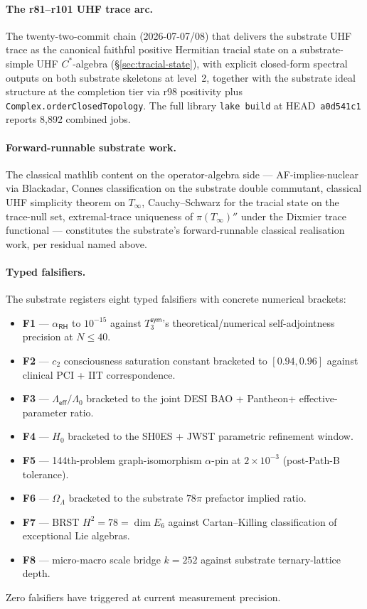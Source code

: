 \documentclass[11pt,a4paper]{amsart}
\theoremstyle{plain}
\theoremstyle{definition}
\begin{document}
\paragraph{The r81--r101 UHF trace arc.} The twenty-two-commit chain (2026-07-07/08) that delivers the substrate UHF trace as the canonical faithful positive Hermitian tracial state on a substrate-simple UHF $C^*$-algebra (\S\ref{sec:tracial-state}), with explicit closed-form spectral outputs on both substrate skeletons at level~2, together with the substrate ideal structure at the completion tier via r98 positivity plus \texttt{Complex.orderClosedTopology}. The full library \texttt{lake build} at HEAD~\texttt{a0d541c1} reports 8{,}892 combined jobs.

\paragraph{Forward-runnable substrate work.} The classical mathlib content on the operator-algebra side --- AF-implies-nuclear via Blackadar, Connes classification on the substrate double commutant, classical UHF simplicity theorem on $T_\infty$, Cauchy--Schwarz for the tracial state on the trace-null set, extremal-trace uniqueness of $\pi(T_\infty)''$ under the Dixmier trace functional --- constitutes the substrate's forward-runnable classical realisation work, per residual named above.

\paragraph{Typed falsifiers.} The substrate registers eight typed falsifiers with concrete numerical brackets:
\begin{itemize}[itemsep=1pt,leftmargin=2em]
\item \textbf{F1} — $\alpha_{\textsf{RH}}$ to $10^{-15}$ against $T_3^{\textsf{sym}}$'s theoretical/numerical self-adjointness precision at $N \le 40$.
\item \textbf{F2} — $c_2$ consciousness saturation constant bracketed to $[0.94, 0.96]$ against clinical PCI + IIT correspondence.
\item \textbf{F3} — $\Lambda_{\textsf{eff}}/\Lambda_0$ bracketed to the joint DESI BAO + Pantheon+ effective-parameter ratio.
\item \textbf{F4} — $H_0$ bracketed to the SH0ES + JWST parametric refinement window.
\item \textbf{F5} — 144th-problem graph-isomorphism $\alpha$-pin at $2 \times 10^{-3}$ (post-Path-B tolerance).
\item \textbf{F6} — $\Omega_\Lambda$ bracketed to the substrate $78\pi$ prefactor implied ratio.
\item \textbf{F7} — BRST $H^2 = 78 = \dim E_6$ against Cartan--Killing classification of exceptional Lie algebras.
\item \textbf{F8} — micro-macro scale bridge $k = 252$ against substrate ternary-lattice depth.
\end{itemize}
Zero falsifiers have triggered at current measurement precision.
\end{document}
